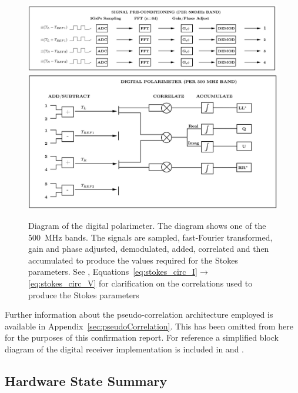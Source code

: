 \begin{figure}[ht]
 \centering
 \includegraphics[width=\textwidth]{images/receiver_schematics/precon.jpg}\\
 \includegraphics[width=\textwidth]{images/receiver_schematics/roach.jpg}
 \caption{Diagram of the digital polarimeter. The diagram shows one of the 500~MHz bands. The signals are sampled, fast-Fourier transformed, gain and phase adjusted, demodulated, added, correlated and then accumulated to produce the values required for the Stokes parameters. See , Equations~\ref{eq:stokes_circ_I}$\rightarrow$\ref{eq:stokes_circ_V} for clarification on the correlations used to produce the Stokes parameters}
 \label{fig:digital_receiver_mine}
\end{figure}
\clearpage

Further information about the pseudo-correlation architecture employed is available in Appendix~\ref{sec:pseudoCorrelation}. This has been omitted from here for the purposes of this confirmation report. For reference a simplified block diagram of the digital receiver implementation is included in  and .


\subsection{Hardware State Summary}

